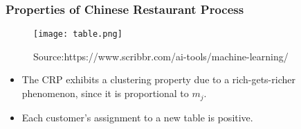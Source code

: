 \documentclass[11pt]{beamer}
\begin{document}
	\begin{frame}
		\frametitle{Properties of Chinese Restaurant Process }

	\begin{figure}
	\centering
	\texttt{[image: table.png]} 
	\caption{Source:https://www.scribbr.com/ai-tools/machine-learning/}
	\label{fig: Source: https://www.scribbr.com/ai-tools/machine-learning/} %
\end{figure}		
		
\begin{itemize}
	\item The CRP exhibits a clustering property due to a rich-gets-richer phenomenon, since it is proportional to $m_j$.
	\item Each customer's assignment to a new table is positive.
\end{itemize}		

	\end{frame}
	
\end{document}
